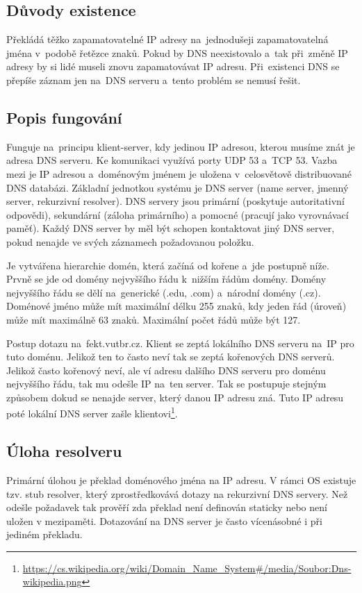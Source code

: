 \subsection{Důvody existence}
Překládá těžko zapamatovatelné IP adresy na~jednodušeji zapamatovatelná jména v~podobě řetězce znaků.
Pokud by DNS neexistovalo a~tak při~změně IP adresy by si lidé museli znovu zapamatovávat IP adresu.
Při~existenci DNS se přepíše záznam jen na~DNS serveru a~tento problém se nemusí řešit.

\subsection{Popis fungování}

Funguje na~principu klient-server, kdy jedinou IP adresou, kterou musíme znát je adresa DNS serveru.
Ke komunikaci využívá porty UDP 53 a~TCP 53.
Vazba mezi je IP adresou a~doménovým jménem je uložena v~celosvětově distribuované DNS databázi.
Základní jednotkou systému je DNS server (name server, jmenný server, rekurzivní resolver).
DNS servery jsou primární (poskytuje autoritativní odpovědi), sekundární (záloha primárního) a pomocné (pracují jako vyrovnávací paměť).
Každý DNS server by měl být schopen kontaktovat jiný DNS server, pokud nenajde ve svých záznamech požadovanou položku.

Je vytvářena hierarchie domén, která začíná od kořene a~jde postupně níže.
Prvně se jde od domény nejvyššího řádu k~nižším řádům domény.
Domény nejvyššího řádu se dělí na~generické (.edu, .com) a~národní domény (.cz).
Doménové jméno může mít maximální délku 255 znaků, kdy jeden řád (úroveň) může mít maximálně 63 znaků. Maximální počet řádů může být 127.

Postup dotazu na~fekt.vutbr.cz.
Klient se zeptá lokálního DNS serveru na~IP pro tuto doménu.
Jelikož ten to často neví tak se zeptá kořenových DNS serverů.
Jelikož často kořenový neví, ale ví adresu dalšího DNS serveru pro doménu nejvyššího řádu, tak mu odešle IP na~ten server.
Tak se postupuje stejným způsobem dokud se nenajde server, který danou IP adresu zná.
Tuto IP adresu poté lokální DNS server zašle klientovi\footnote{\url{https://cs.wikipedia.org/wiki/Domain_Name_System\#/media/Soubor:Dns-wikipedia.png}}.

\subsection{Úloha resolveru}

Primární úlohou je překlad doménového jména na IP adresu.
V rámci OS existuje tzv. stub resolver, který zprostředkovává dotazy na rekurzivní DNS servery.
Než odešle požadavek tak prověří zda překlad není definován staticky nebo není uložen v mezipaměti.
Dotazování na DNS server je často vícenásobné i při jediném překladu.


